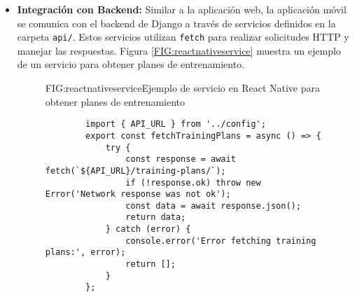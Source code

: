 \begin{itemize}
    \item \textbf{Integración con Backend:} Similar a la aplicación web, la aplicación móvil se comunica con el backend de Django a través de servicios definidos en la carpeta \texttt{api/}. Estos servicios utilizan \texttt{fetch} para realizar solicitudes HTTP y manejar las respuestas. Figura \ref{FIG:reactnativeservice} muestra un ejemplo de un servicio para obtener planes de entrenamiento.
    \begin{figure}[Ejemplo Servicio React Native]{FIG:reactnativeservice}{Ejemplo de servicio en React Native para obtener planes de entrenamiento}
    \begin{verbatim}
        import { API_URL } from '../config';
        export const fetchTrainingPlans = async () => {
            try {
                const response = await fetch(`${API_URL}/training-plans/`);
                if (!response.ok) throw new Error('Network response was not ok');
                const data = await response.json();
                return data;
            } catch (error) {
                console.error('Error fetching training plans:', error);
                return [];
            }
        };
    \end{verbatim}
    \end{figure}

\end{itemize}
